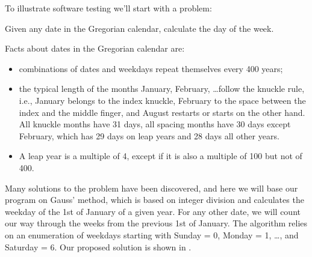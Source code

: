 To illustrate software testing we'll start with a problem:
\begin{problem}
  Given any date in the Gregorian calendar, calculate the day of the week.
\end{problem}
Facts about dates in the Gregorian calendar are:
\begin{itemize}
\item combinations of dates and weekdays repeat themselves every 400 years;
\item the typical length of the months January, February, \dots follow the knuckle rule, i.e., January belongs to the index knuckle, February to the space between the index and the middle finger, and August restarts or starts on the other hand. All knuckle months have 31 days, all spacing months have 30 days except February, which has 29 days on leap years and 28 days all other years.
\item A leap year is a multiple of 4, except if it is also a multiple of 100 but not of 400.
\end{itemize}
Many solutions to the problem have been discovered, and here we will base our program on Gauss' method, which is based on integer division and calculates the weekday of the 1st of January of a given year. For any other date, we will count our way through the weeks from the previous 1st of January. The algorithm relies on an enumeration of weekdays starting with Sunday = 0, Monday = 1, \dots, and Saturday = 6. Our proposed solution is shown in .
% 
% 

